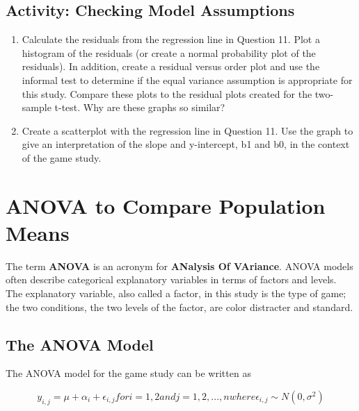 \documentclass[
]{book}
\begin{document}
\hypertarget{activity-checking-model-assumptions}{%
\subsection*{Activity: Checking Model Assumptions}\label{activity-checking-model-assumptions}}

\begin{enumerate}
\def\labelenumi{\arabic{enumi}.}
\setcounter{enumi}{13}
\item
  Calculate the residuals from the regression line in Question 11. Plot a histogram of the residuals (or create a normal probability plot of the residuals). In addition, create a residual versus order plot and use the informal test to determine if the equal variance assumption is appropriate for this study. Compare these plots to the residual plots created for the two-sample t-test. Why are these graphs so similar?
\item
  Create a scatterplot with the regression line in Question 11. Use the graph to give an interpretation of the slope and y-intercept, b1 and b0, in the context of the game study.
\end{enumerate}

\hypertarget{anova-to-compare-population-means}{%
\section{ANOVA to Compare Population Means}\label{anova-to-compare-population-means}}

The term \textbf{ANOVA} is an acronym for \textbf{ANalysis Of VAriance}. ANOVA models often describe categorical explanatory variables in terms of factors and levels. The explanatory variable, also called a factor, in
this study is the type of game; the two conditions, the two levels of the factor, are color distracter and standard.

\hypertarget{the-anova-model}{%
\subsection{The ANOVA Model}\label{the-anova-model}}

The ANOVA model for the game study can be written as

\begin{equation}
\label{2.6} y_{i,j} = \mu + \alpha_i + \epsilon_{i,j} for i = 1, 2 and j = 1, 2, ... , n where \epsilon_{i,j} \sim N(0,\sigma^2) \tag{2.6}
\end{equation}
\end{document}
